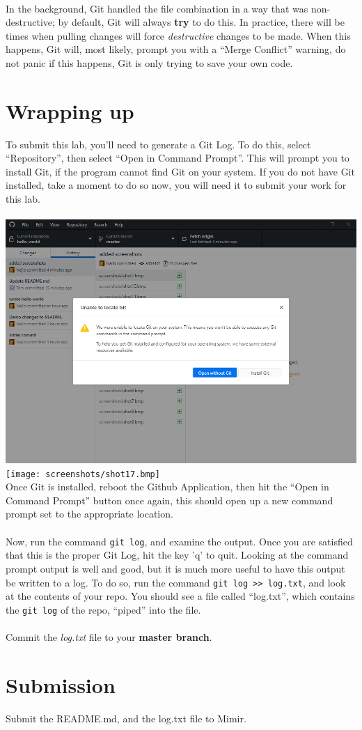 \documentclass[12pt, letter]{article}
\begin{document}
    \\
    In the background, Git handled the file combination in a way that was non-destructive; by default, Git will always \textbf{try} to do this. In practice, there will be times when pulling changes will force \emph{destructive} changes to be made. When this happens, Git will, most likely, prompt you with a ``Merge Conflict'' warning, do not panic if this happens, Git is only trying to save your own code.

    \section{Wrapping up}
    To submit this lab, you'll need to generate a Git Log. To do this, select ``Repository'', then select ``Open in Command Prompt''. This will prompt you to install Git, if the program cannot find Git on your system. If you do not have Git installed, take a moment to do so now, you will need it to submit your work for this lab. \\ \\ %
    \includegraphics{screenshots/shot16.bmp} \\
    \texttt{[image: screenshots/shot17.bmp]}
    \\
    Once Git is installed, reboot the Github Application, then hit the ``Open in Command Prompt'' button once again, this should open up a new command prompt set to the appropriate location. 
    \\ \\
    Now, run the command \verb|git log|, and examine the output. Once you are satisfied that this is the proper Git Log, hit the key 'q' to quit. Looking at the command prompt output is well and good, but it is much more useful to have this output be written to a log. To do so, run the command \verb|git log >> log.txt|, and look at the contents of your repo. You should see a file called ``log.txt'', which contains the \verb|git log| of the repo, ``piped'' into the file. 
    \\ \\
    Commit the \emph{log.txt} file to your \textbf{master branch}.
    \section{Submission}
    Submit the README.md, and the log.txt file to Mimir.
\end{document}
